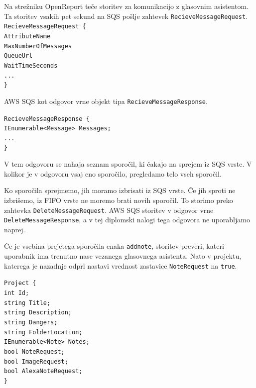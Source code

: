 \documentclass[a4paper, 12pt]{book}
\begin{document}
Na strežniku OpenReport teče storitev za komunikacijo z glasovnim asistentom.
Ta storitev vsakih pet sekund na SQS pošlje zahtevek \texttt{RecieveMessageRequest}.
\noindent\texttt{RecieveMessageRequest \{ \\
AttributeName \\ %
MaxNumberOfMessages \\ %
QueueUrl \\ %
WaitTimeSeconds \\ %
... \\
\} 
}

AWS SQS kot odgovor vrne objekt tipa \texttt{RecieveMessageResponse}.

\noindent\texttt{RecieveMessageResponse \{ \\
IEnumerable<Message> Messages;\\
... \\
\} }

V tem odgovoru se nahaja seznam sporočil, ki čakajo na sprejem iz SQS vrste.
V kolikor je v odgovoru vsaj eno sporočilo, pregledamo telo vseh sporočil. 

Ko sporočila sprejmemo, jih moramo izbrisati iz SQS vrste.
Če jih sproti ne izbrišemo, iz FIFO vrste ne moremo brati novih sporočil.
To storimo preko zahtevka \texttt{DeleteMessageRequest}.
AWS SQS storitev v odgovor vrne \texttt{DeleteMessageResponse}, a v tej diplomski nalogi tega odgovora ne uporabljamo naprej.

Če je vsebina prejetega sporočila enaka \texttt{addnote}, storitev preveri, kateri uporabnik ima trenutno nase vezanega glasovnega asistenta.
Nato v projektu, katerega je nazadnje odprl nastavi vrednost zastavice \texttt{NoteRequest} na \texttt{true}.

\noindent \texttt{Project \{ \\
int Id; \\
string Title; \\
string Description; \\
string Dangers; \\
string FolderLocation; \\
IEnumerable<Note> Notes; \\
bool NoteRequest; \\
bool ImageRequest; \\
bool AlexaNoteRequest; \\
\}
}
\end{document}
